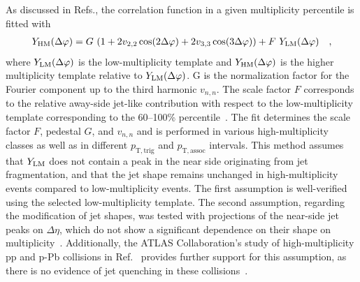 As discussed in Refs.\cite{ATLAS:2015hzw,ATLAS:2016yzd}, the correlation function in a given multiplicity percentile is fitted with 
\begin{eqnarray}
\label{eq:narray}
Y_{\rm{HM}}(\Delta\varphi) = G~(1 + 2v_{2,2}\cos(2\Delta\varphi) + 2v_{3,3}\cos(3\Delta\varphi)) + F~Y_{\rm{LM}}(\Delta\varphi) \quad,
\end{eqnarray}
where $Y_{\rm{LM}}(\Delta\varphi)$ is the low-multiplicity template and $Y_{\rm{HM}}(\Delta\varphi)$ is the higher multiplicity template relative to $Y_{\rm{LM}}(\Delta\varphi)$. G is the normalization factor for the Fourier component up to the third harmonic $v_{n,n}$. The scale factor $F$ corresponds to the relative away-side jet-like contribution with respect to the low-multiplicity template corresponding to the 60--100\% percentile~\cite{ALICE:2013tla,ALICE:2014mas}. 
The fit determines the scale factor $F$, pedestal $G$, and $v_{n,n}$ and is performed in various high-multiplicity classes as well as in different $p_\mathrm{T,trig}$ and $p_\mathrm{T,assoc}$ intervals. 
This method assumes that $Y_{\rm{LM}}$ does not contain a peak in the near side originating from jet fragmentation, and that the jet shape remains unchanged in high-multiplicity events compared to low-multiplicity events. The first assumption is well-verified using the selected low-multiplicity template. The second assumption, regarding the modification of jet shapes, was tested with projections of the near-side jet peaks on $\Delta\eta$, which do not show a significant dependence on their shape on multiplicity~\cite{LAKOMOV2017329}. Additionally, the ATLAS Collaboration's study of high-multiplicity pp and p-Pb collisions in Ref.~\cite{ATLAS:2018ngv} provides further support for this assumption, as there is no evidence of jet quenching in these collisions~\cite{Adam:2014qja,Khachatryan:2016odn,Adam:2016jfp,Adam:2016dau,Acharya:2017okq}.

